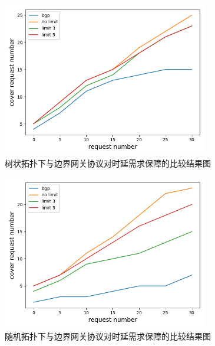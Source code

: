 \begin{figure}[htbp]
\setlength{\abovecaptionskip}{15pt plus 3pt minus 2pt}
\centerline{\includegraphics[width=0.8\textwidth]{./figures/ch4-test-tree-topo.png}}
\caption{树状拓扑下与边界网关协议对时延需求保障的比较结果图}
\label{fig-ch4-test-tree-topo}
\end{figure}

\begin{figure}[htbp]
\setlength{\abovecaptionskip}{15pt plus 3pt minus 2pt}
\centerline{\includegraphics[width=0.8\textwidth]{./figures/ch4-test-random-topo.png}}
\caption{随机拓扑下与边界网关协议对时延需求保障的比较结果图}
\label{fig-ch4-test-random-topo}
\end{figure}

